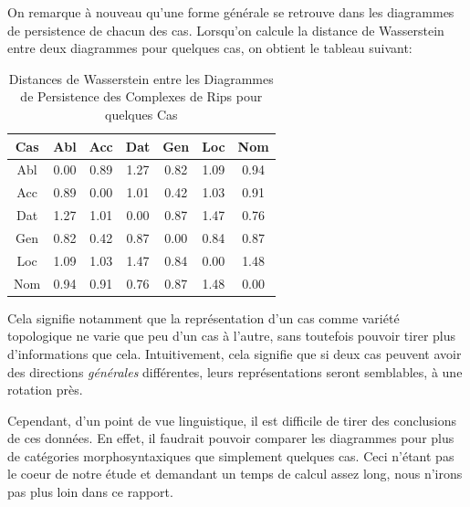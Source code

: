 \documentclass{cours}
\begin{document}
On remarque à nouveau qu'une forme générale se retrouve dans les diagrammes de persistence de chacun des cas.
Lorsqu'on calcule la distance de Wasserstein entre deux diagrammes pour quelques cas, on obtient le tableau suivant:

\begin{table}
\centering
\begin{tabular}{c|cccccc}
	\toprule
	Cas & Abl & Acc & Dat & Gen & Loc & Nom\\
	\midrule
	Abl & 0.00 & 0.89 & 1.27 & 0.82 & 1.09 & 0.94\\
	Acc & 0.89 & 0.00 & 1.01 & 0.42 & 1.03 & 0.91\\
	Dat & 1.27 & 1.01 & 0.00 & 0.87 & 1.47 & 0.76\\
	Gen & 0.82 & 0.42 & 0.87 & 0.00 & 0.84 & 0.87\\
	Loc & 1.09 & 1.03 & 1.47 & 0.84 & 0.00 & 1.48\\
	Nom & 0.94 & 0.91 & 0.76 & 0.87 & 1.48 & 0.00\\
	\bottomrule
\end{tabular}
\caption{Distances de Wasserstein entre les Diagrammes de Persistence des Complexes de Rips pour quelques Cas}
\label{tab_wass_rc}
\end{table}

Cela signifie notamment que la représentation d'un cas comme variété topologique ne varie que peu d'un cas à l'autre, sans toutefois pouvoir tirer plus d'informations que cela.
Intuitivement, cela signifie que si deux cas peuvent avoir des directions \textit{générales} différentes, leurs représentations seront semblables, à une rotation près.

Cependant, d'un point de vue linguistique, il est difficile de tirer des conclusions de ces données. En effet, il faudrait pouvoir comparer les diagrammes pour plus de catégories morphosyntaxiques que simplement quelques cas. Ceci n'étant pas le coeur de notre étude et demandant un temps de calcul assez long, nous n'irons pas plus loin dans ce rapport.
\end{document}

